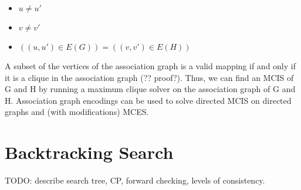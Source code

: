 \begin{itemize}
  \item $u \not= u'$
  \item $v \not= v'$
  \item $((u,u') \in E(G)) = ((v,v') \in E(H))$
\end{itemize}

A subset of the vertices of the association graph is a valid mapping if and
only if it is a clique in the association graph (?? proof?). Thus, we can find
an MCIS of G and H by running a maximum clique solver on the association graph
of G and H. Association graph encodings can be used to solve directed MCIS on
directed graphs and (with modifications) MCES.

\section{Backtracking Search}

TODO: describe search tree, CP, forward checking, levels of consistency.

